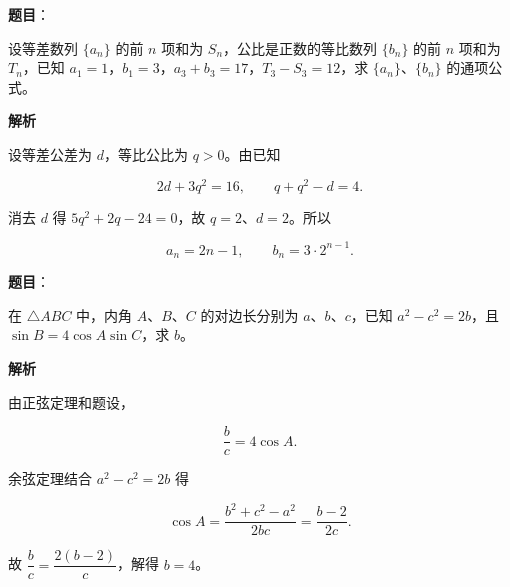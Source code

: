 \begin{answer}

\textbf{题目}：

设等差数列 $\{a_n\}$ 的前 $n$ 项和为 $S_n$，公比是正数的等比数列 $\{b_n\}$ 的前 $n$ 项和为 $T_n$，已知 $a_1=1$，$b_1=3$，$a_3+b_3=17$，$T_3-S_3=12$，求 $\{a_n\}$、$\{b_n\}$ 的通项公式。

\textbf{解析}

设等差公差为 $d$，等比公比为 $q>0$。由已知

\nopagebreak[4]
\[
2d+3q^2=16,\qquad q+q^2-d=4.
\]

消去 $d$ 得 $5q^2+2q-24=0$，故 $q=2$、$d=2$。所以

\nopagebreak[4]
\[
a_n=2n-1,\qquad b_n=3\cdot2^{n-1}.
\]


\end{answer}
\begin{answer}

\textbf{题目}：

在 $\triangle ABC$ 中，内角 $A\text{、}B\text{、}C$ 的对边长分别为 $a\text{、}b\text{、}c$，已知 $a^2-c^2=2b$，且 $\sin B=4\cos A\sin C$，求 $b$。

\textbf{解析}

由正弦定理和题设，

\nopagebreak[4]
\[
\frac bc=4\cos A.
\]

余弦定理结合 $a^2-c^2=2b$ 得

\nopagebreak[4]
\[
\cos A=\frac{b^2+c^2-a^2}{2bc}=\frac{b-2}{2c}.
\]

故 $\dfrac bc=\dfrac{2(b-2)}c$，解得 $b=4$。


\end{answer}
